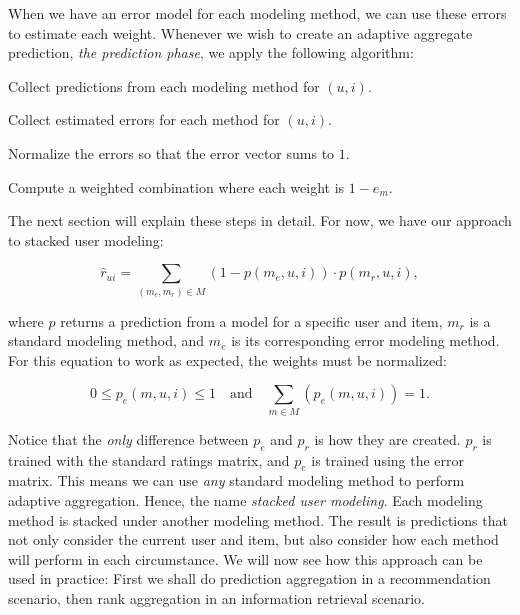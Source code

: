 When we have an error model for each modeling method, 
we can use these errors to estimate each weight.
Whenever we wish to create an adaptive aggregate prediction,
\emph{the prediction phase},
we apply the following algorithm:

\begin{enumerate*}
  \item Collect predictions from each modeling method for $(u,i)$.
  \item Collect estimated errors for each method for $(u,i)$.
  \item Normalize the errors so that the error vector sums to $1$.
  \item Compute a weighted combination where each weight is $1 - e_m$.
\end{enumerate*}

The next section will explain these steps in detail.
For now, we have our approach to stacked user modeling:

\begin{equation*}
  \hat{r}_{ui} = \sum_{(m_{e}, m_{r}) \in M} (1 - p(m_{e},u,i)) \cdot p(m_{r},u,i),
\end{equation*}

where $p$ returns a prediction from a model for a specific user and item,
$m_{r}$ is a standard modeling method, 
and $m_{e}$ is its corresponding error modeling method.
For this equation to work as expected, the weights must be normalized:

\begin{equation*}
  0 \leq p_{e}(m,u,i) \leq 1 \quad \text{and} \quad \sum_{m \in M} (p_{e}(m,u,i)) = 1.
\end{equation*}

Notice that the \emph{only} difference between $p_e$ and $p_r$ is how they are created.
$p_r$ is trained with the standard ratings matrix, and $p_e$ is trained using the error matrix.
This means we can use \emph{any} standard modeling method to perform adaptive aggregation.
Hence, the name \emph{stacked user modeling}. Each modeling method
is stacked under another modeling method.
The result is predictions that not only consider the current user and item,
but also consider how each method will perform in each circumstance.
We will now see how this approach can be used in practice:
First we shall do prediction aggregation in a recommendation scenario,
then rank aggregation in an information retrieval scenario.


